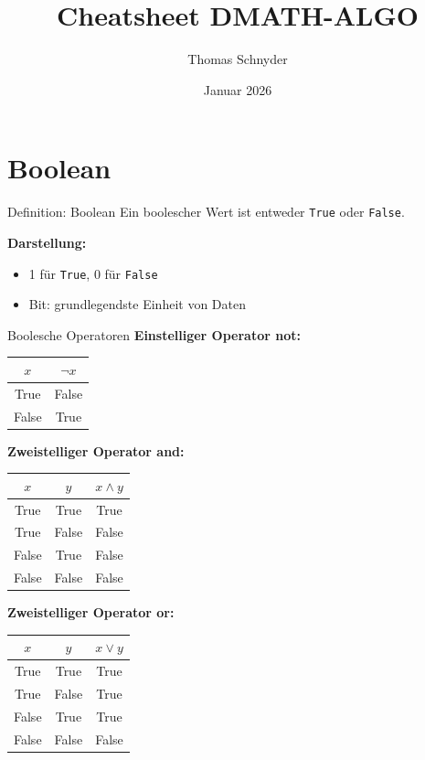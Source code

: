\documentclass[a4paper, fontsize=7pt]{scrartcl}
\title{Cheatsheet DMATH-ALGO}
\author{Thomas Schnyder}
\date{Januar 2026}
\begin{document}
\maketitle

\section{Boolean}

\begin{mainbox}{Definition: Boolean}
Ein boolescher Wert ist entweder \texttt{True} oder \texttt{False}.

\textbf{Darstellung:}
\begin{itemize}
    \item 1 für \texttt{True}, 0 für \texttt{False}
    \item Bit: grundlegendste Einheit von Daten
\end{itemize}
\end{mainbox}

\begin{mainbox}{Boolesche Operatoren}
\textbf{Einstelliger Operator not:}
\begin{center}
\begin{tabular}{c|c}
$x$ & $\neg x$ \\
\hline
True & False \\
False & True
\end{tabular}
\end{center}

\textbf{Zweistelliger Operator and:}
\begin{center}
\begin{tabular}{cc|c}
$x$ & $y$ & $x \land y$ \\
\hline
True & True & True \\
True & False & False \\
False & True & False \\
False & False & False
\end{tabular}
\end{center}

\textbf{Zweistelliger Operator or:}
\begin{center}
\begin{tabular}{cc|c}
$x$ & $y$ & $x \lor y$ \\
\hline
True & True & True \\
True & False & True \\
False & True & True \\
False & False & False
\end{tabular}
\end{center}
\end{mainbox}
\end{document}
